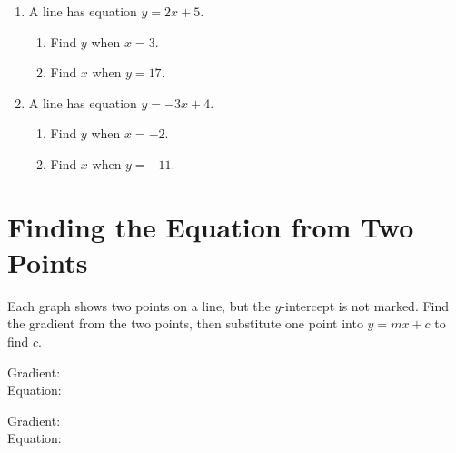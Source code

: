 \documentclass[11pt]{article}
\newcommand{\ans}{\hrulefill}
\newcommand{\markpt}[3]{\filldraw (axis cs:#1,#2) circle (1.5pt); \node[#3, font=\small] at (axis cs:#1,#2) {$(#1,#2)$};}
\newcommand{\gridaxis}[6]{%
  \begin{axis}[
    width=7.2cm, height=6.4cm,
    xmin=#1, xmax=#2, ymin=#3, ymax=#4,
    grid=both, grid style={line width=.1pt, draw=gray!35},
    axis lines=middle,
    xlabel={$x$}, ylabel={$y$},
    xtick distance=#5, ytick distance=#6,
    tick label style={font=\tiny},
    label style={font=\small},
    xlabel style={at={(axis description cs:1,0)}, anchor=north west},
    ylabel style={at={(axis description cs:0,1)}, anchor=south east},
    axis line style={-{Latex[length=1.8mm]}},
  ]
}
\begin{document}
\begin{enumerate}
  \item A line has equation $y = 2x + 5$.
  \begin{enumerate}
    \item Find $y$ when $x = 3$. \ans
    \item Find $x$ when $y = 17$. \ans
  \end{enumerate}

  \item A line has equation $y = -3x + 4$.
  \begin{enumerate}
    \item Find $y$ when $x = -2$. \ans
    \item Find $x$ when $y = -11$. \ans
  \end{enumerate}
\end{enumerate}

\newpage
\section{Finding the Equation from Two Points}
\noindent Each graph shows two points on a line, but the $y$-intercept is not marked. Find the gradient from the two points, then substitute one point into $y = mx + c$ to find $c$.

\begin{center}
\begin{minipage}{0.47\linewidth}
\centering
{}

\vspace{0.3em}
Gradient: \ans \\[0.4em]
Equation: \ans
\end{minipage}
\hfill
\begin{minipage}{0.47\linewidth}
\centering
{}

\vspace{0.3em}
Gradient: \ans \\[0.4em]
Equation: \ans
\end{minipage}
\end{center}
\end{document}
